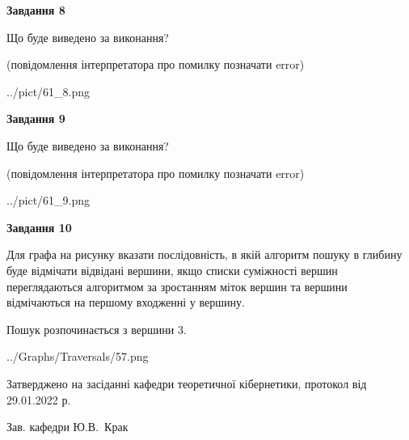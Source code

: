 \documentclass[12pt, ukrainian]{article}
\begin{document}
{\begin {large}
{\begin {center}\textbf{Завдання 8}\end {center}}\par
Що буде виведено за виконання?\par
 (повідомлення інтерпретатора про помилку позначати error)
\begin{center}
	{../pict/61_8.png}
\end{center}
\newpage

{\begin {center}\textbf{Завдання 9}\end {center}}\par
Що буде виведено за виконання?\par
 (повідомлення інтерпретатора про помилку позначати error)\par
\begin{center}
	{../pict/61_9.png}
\end{center}
\newpage

{\begin {center}\textbf{Завдання 10}\end {center}}\par
Для графа на рисунку вказати послідовність, в якій алгоритм пошуку в глибину буде відмічати відвідані вершини, якщо списки суміжності вершин переглядаються алгоритмом за зростанням міток вершин та вершини відмічаються на першому вход\-женні у вершину.\par
Пошук розпочинається з вершини 3.\par

\begin{center}
	{../Graphs/Traversals/57.png}
\end{center}\par
\newpage


\end {large}
}
{\smallskip \begin {small} Затверджено на засіданні кафедри теоретичної кібернетики, протокол  від   29.01.2022 р.\par\smallskip\smallskip
{\parbox {6.5 cm}{Зав. кафедри \dotfill Ю.В.~Крак}} \end{small}}
\end{document}
